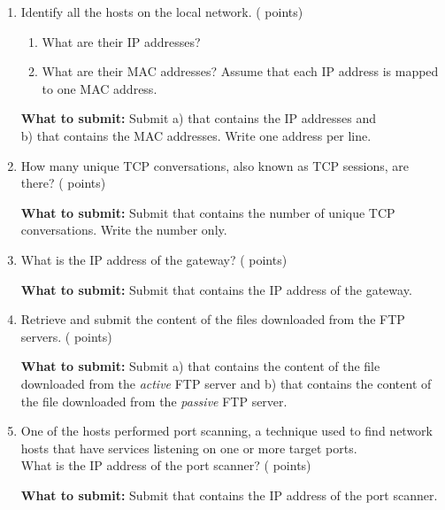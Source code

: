 \begin{enumerate}
  \item \hypertarget{cp1macip}{Identify all the hosts on the local network. ( points)} \label{itm:macip}

    \begin{enumerate}[label=\alph*),nosep]
      \item What are their IP addresses?
      \item What are their MAC addresses? Assume that each IP address is mapped to one MAC address.
    \end{enumerate}

    \textbf{What to submit:} Submit
      a) \texttt{\hyperlink{ipformat}{\fileip}} that contains the IP addresses and\\
      b) \texttt{\hyperlink{macformat}{\filemac}} that contains the MAC addresses.
      Write one address per line.

  \item \hypertarget{cp1tcp}{How many unique TCP conversations, also known as TCP sessions, are there? ( points)} \label{itm:tcp}

    \textbf{What to submit:} Submit
      \texttt{\hyperlink{tcpformat}{\filetcp}} that contains the number of unique TCP conversations.
      Write the number only.

  \item \hypertarget{cp1gw}{What is the IP address of the gateway? ( points)} \label{itm:gw}

    \textbf{What to submit:} Submit
      \texttt{\hyperlink{gwformat}{\filegw}} that contains the IP address of the gateway.
  \item \hypertarget{cp1ftp}{Retrieve and submit the content of the files downloaded from the FTP servers. ( points)} \label{itm:ftp}

    \textbf{What to submit:} Submit
      a) \texttt{\hyperlink{activeformat}{\fileactive}} that contains the content of the file downloaded from the \textit{active} FTP server
      and b) \texttt{\hyperlink{passiveformat}{\filepassive}} that contains the content of the file downloaded from the \textit{passive} FTP server.

  \item \hypertarget{cp1portscan}{One of the hosts performed port scanning, a technique used to find network hosts that have services listening on one or more target ports.\\
  What is the IP address of the port scanner? ( points)} \label{itm:portscan}

    \textbf{What to submit:} Submit
      \texttt{\hyperlink{portscanformat}{\fileportscan}} that contains the IP address of the port scanner.

\end{enumerate}

